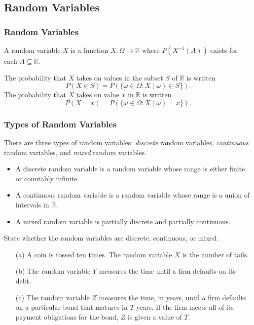\documentclass{beamer}
\begin{document}
\subsection{Random Variables} 

\begin{frame}
\frametitle{Random Variables}

\begin{Definition}
A random variable $X$ is a function $X:\Omega\to\mathbb{R}$ where $P\left(X^{-1}(A)\right)$ exists for each $A\subseteq\mathbb{R}$.
\end{Definition}

The probability that $X$ takes on values in the subset $S$ of $\mathbb{R}$ is written
$$
P(X\in S) = P\left(\{\omega \in\Omega : X(\omega)\in S\}\right).
$$
The probability that $X$ takes on value $x$ in $\mathbb{R}$ is written
$$
P(X = x) = P\left( \{\omega \in\Omega : X(\omega) = x\} \right).
$$
\end{frame}

\begin{frame}
\frametitle{Types of Random Variables}
There are three types of random variables: {\it discrete} random variables, {\it continuous} random variables, and {\it mixed} random variables. 
\begin{itemize}
\item A discrete random variable is a random variable whose range is either finite or countably infinite. 
\item A continuous random variable is a random variable whose range is a union of intervals in $\mathbb{R}$. 
\item A mixed random variable is partially discrete and partially continuous.
\end{itemize}

\end{frame}

\begin{frame}[t]
\begin{Example}
State whether the random variables are discrete, continuous, or mixed.
\begin{enumerate}
\item[(a)] A coin is tossed ten times. The random variable $X$ is the number of tails.
\item[(b)] The random variable $Y$ measures the time until a firm defaults on its debt.
\item[(c)] The random variable $Z$ measures the time, in years, until a firm defaults on a particular bond that matures in $T$ years. If the firm meets all of its payment obligations for the bond, $Z$ is given a value of $T$.
\end{enumerate}
\end{Example}

\end{frame}
\end{document}
